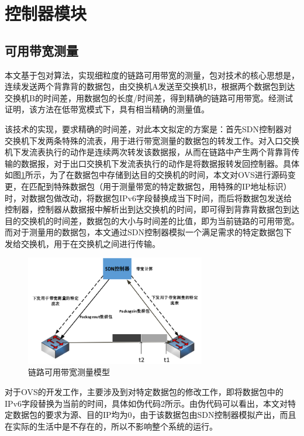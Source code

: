 \section{控制器模块}
\subsection{可用带宽测量}
本文基于包对算法，实现细粒度的链路可用带宽的测量，包对技术的核心思想是，连续发送两个背靠背的数据包，由交换机A发送至交换机B，根据两个数据包到达交换机B的时间差，用数据包的长度/时间差，得到精确的链路可用带宽。经测试证明，该方法在低带宽模式下，具有相当精确的测量值。

该技术的实现，要求精确的时间差，对此本文拟定的方案是：首先SDN控制器对交换机下发两条特殊的流表，用于进行带宽测量的数据包的转发工作。对入口交换机下发流表执行的动作是连续两次转发该数据报，从而在链路中产生两个背靠背传输的数据报，对于出口交换机下发流表执行的动作是将数据报转发回控制器。具体如图\ref{fig:spaceband}所示，为了在数据包中存储到达目的交换机的时间，本文对\gls*{OVS}进行源码变更，在匹配到特殊数据包（用于测量带宽的特定数据包，用特殊的IP地址标识）时，对数据包做改动，将数据包IPv6字段替换成当下时间，而后将数据包发送给控制器，控制器从数据报中解析出到达交换机的时间，即可得到背靠背数据包到达目的交换机的时间差，数据包的大小与时间差的比值，即为当前链路的可用带宽。而对于测量用的数据包，本文通过SDN控制器模拟一个满足需求的特定数据包下发给交换机，用于在交换机之间进行传输。

\begin{figure}[!htb]
  \centering
  \includegraphics[width=0.7\textwidth]{logo/spaceband.png}
  \caption{链路可用带宽测量模型}
  \label{fig:spaceband}
\end{figure}

对于OVS的开发工作，主要涉及到对特定数据包的修改工作，即将数据包中的IPv6字段替换为当前的时间，具体如伪代码2所示。由伪代码可以看出，本文对特定数据包的要求为源、目的IP均为0，由于该数据包由SDN控制器模拟产出，而且在实际的生活中是不存在的，所以不影响整个系统的运行。

